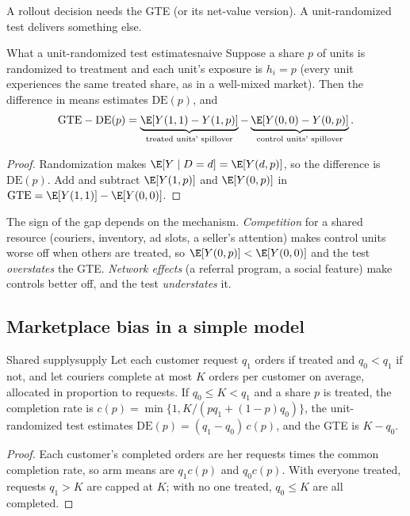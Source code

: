 \documentclass[11pt]{article}
\begin{document}
A rollout decision needs the GTE (or its net-value version). A unit-randomized test delivers something else.

\begin{prop}{What a unit-randomized test estimates}{naive}
Suppose a share $p$ of units is randomized to treatment and each unit's exposure is $h_i = p$ (every unit
experiences the same treated share, as in a well-mixed market). Then the difference in means estimates
$\text{DE}(p)$, and
\[
  \text{GTE} - \text{DE}(p) = \underbrace{\E[Y(1,1) - Y(1,p)]}_{\text{treated units' spillover}} - \underbrace{\E[Y(0,0) - Y(0,p)]}_{\text{control units' spillover}} .
\]
\end{prop}
\begin{proof}
Randomization makes $\E[Y \mid D=d] = \E[Y(d,p)]$, so the difference is $\text{DE}(p)$. Add and subtract
$\E[Y(1,p)]$ and $\E[Y(0,p)]$ in $\text{GTE} = \E[Y(1,1)] - \E[Y(0,0)]$.
\end{proof}

The sign of the gap depends on the mechanism. \emph{Competition} for a shared resource (couriers, inventory, ad
slots, a seller's attention) makes control units worse off when others are treated, so $\E[Y(0,p)] < \E[Y(0,0)]$ and
the test \emph{overstates} the GTE. \emph{Network effects} (a referral program, a social feature) make controls
better off, and the test \emph{understates} it.

\subsection{Marketplace bias in a simple model}

\begin{prop}{Shared supply}{supply}
Let each customer request $q_1$ orders if treated and $q_0 < q_1$ if not, and let couriers complete at most $K$ orders
per customer on average, allocated in proportion to requests. If $q_0 \le K < q_1$ and a share $p$ is treated, the
completion rate is $c(p) = \min\{1, K/(pq_1 + (1-p)q_0)\}$, the unit-randomized test estimates
$\text{DE}(p) = (q_1 - q_0)\,c(p)$, and the GTE is $K - q_0$.
\end{prop}
\begin{proof}
Each customer's completed orders are her requests times the common completion rate, so arm means are $q_1c(p)$ and
$q_0c(p)$. With everyone treated, requests $q_1 > K$ are capped at $K$; with no one treated, $q_0 \le K$ are all
completed.
\end{proof}
\end{document}

